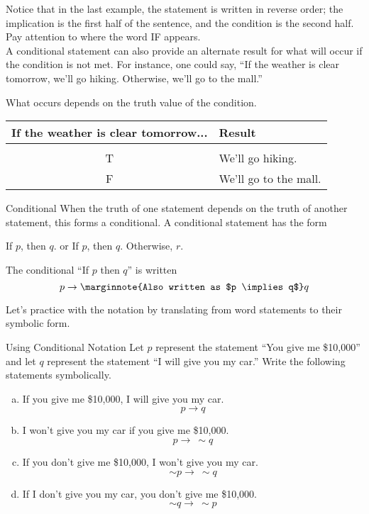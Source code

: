 Notice that in the last example, the statement is written in reverse order; the implication is the first half of the sentence, and the condition is the second half.  Pay attention to where the word IF appears.\\

A conditional statement can also provide an alternate result for what will occur if the condition is not met.  For instance, one could say, ``If the weather is clear tomorrow, we'll go hiking.  Otherwise, we'll go to the mall.''

What occurs depends on the truth value of the condition.
\begin{center}
\begin{tabular}{c l}
If the weather is clear tomorrow... & Result\\
\hline
& \\
T & We'll go hiking.\\
F & We'll go to the mall.
\end{tabular}
\end{center}

\begin{proc}{Conditional}
When the truth of one statement depends on the truth of another statement, this forms a conditional.  A conditional statement has the form 
\begin{center}
If $p$, then $q$. \hspace{0.25in} or \hspace{0.25in} If $p$, then $q$.  Otherwise, $r$.\\
\end{center}

The conditional ``If $p$ then $q$'' is written
\[p \to\marginnote{Also written as $p \implies q$} q\]
\end{proc}

\vfill
\pagebreak

Let's practice with the notation by translating from word statements to their symbolic form.

\begin{example}[https://www.youtube.com/watch?v=_rnB6rre2zM]{Using Conditional Notation}
Let $p$ represent the statement ``You give me \$10,000'' and let $q$ represent the statement ``I will give you my car.''  Write the following statements symbolically.

\begin{enumerate}[(a)]
\item If you give me \$10,000, I will give you my car.
\[p \to q\]

\item I won't give you my car if you give me \$10,000.
\[p \to\ \sim q\]

\item If you don't give me \$10,000, I won't give you my car.
\[\sim p \to\ \sim q\]

\item If I don't give you my car, you don't give me \$10,000.
\[\sim q \to\ \sim p\]
\end{enumerate}
\end{example}

